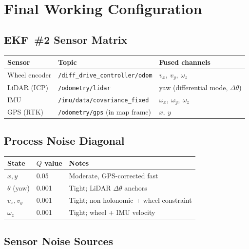 \documentclass[11pt,a4paper]{article}
\begin{document}
\section{Final Working Configuration}

\subsection{EKF~\#2 Sensor Matrix}

\begin{table}[H]
\centering
\begin{tabular}{@{}lll@{}}
\toprule
\textbf{Sensor} & \textbf{Topic} & \textbf{Fused channels} \\
\midrule
Wheel encoder & \texttt{/diff\_drive\_controller/odom} & $v_x,\ v_y,\ \omega_z$ \\
LiDAR (ICP)   & \texttt{/odometry/lidar}                 & yaw (differential mode, $\Delta\theta$) \\
IMU           & \texttt{/imu/data/covariance\_fixed}     & $\omega_x,\ \omega_y,\ \omega_z$ \\
GPS (RTK)     & \texttt{/odometry/gps} (in map frame)    & $x,\ y$ \\
\bottomrule
\end{tabular}
\end{table}

\subsection{Process Noise Diagonal}

\begin{table}[H]
\centering
\begin{tabular}{@{}lll@{}}
\toprule
State & $Q$ value & Notes \\
\midrule
$x, y$       & 0.05    & Moderate, GPS-corrected fast \\
$\theta$ (yaw) & 0.001 & Tight; LiDAR $\Delta\theta$ anchors \\
$v_x, v_y$   & 0.001   & Tight; non-holonomic + wheel constraint \\
$\omega_z$   & 0.001   & Tight; wheel + IMU velocity \\
\bottomrule
\end{tabular}
\end{table}

\subsection{Sensor Noise Sources}
\end{document}

